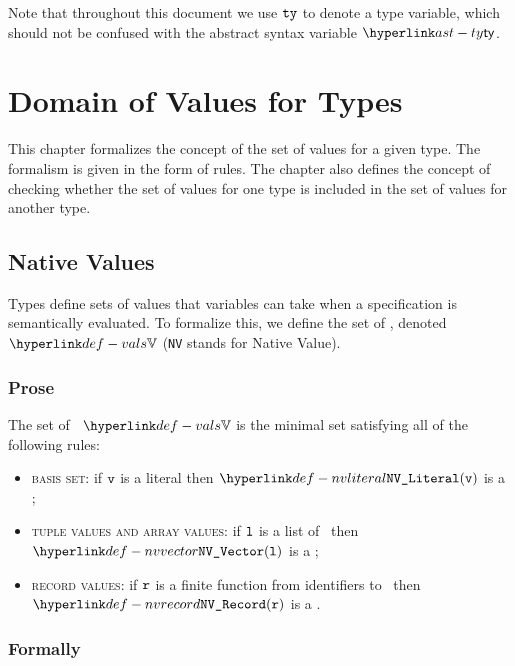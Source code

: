 Note that throughout this document we use $\texttt{ty}$ to denote a type variable, which should not be confused with the abstract syntax variable $\ty$.

\chapter{Domain of Values for Types\label{chap:DomainOfValuesForTypes}}
This chapter formalizes the concept of the set of values for a given type.
The formalism is given in the form of rules.
%
The chapter also defines the concept of checking whether the set of values
for one type is included in the set of values for another type.

\hypertarget{def-vals}{}
\hypertarget{def-nativevalue}{}
\hypertarget{def-nativevalues}{}
\section{Native Values \label{sec:nativevalues}}

Types define sets of values that variables can take when a specification is semantically evaluated.
To formalize this, we define the set of \emph{\nativevalues}, denoted $\vals$
(\texttt{NV} stands for Native Value).

\subsection{Prose}
The set of \nativevalues\ $\vals$ is the minimal set satisfying all of the following rules:
\begin{itemize}
  \item \textsc{basis set}: if $\texttt{v}$ is a literal then $\nvliteral{\vv}$ is a \nativevalue;
  \item \textsc{tuple values and array values}: if $\texttt{l}$ is a list of \nativevalues\ then $\nvvector{\vl}$ is a \nativevalue;
  \item \textsc{record values}: if $\texttt{r}$ is a finite function from identifiers to \nativevalues\ then $\nvrecord{\vr}$ is a \nativevalue.
\end{itemize}

\subsection{Formally}
\hypertarget{def-nvliteral}{}
\hypertarget{def-nvvector}{}
\hypertarget{def-nvrecord}{}

